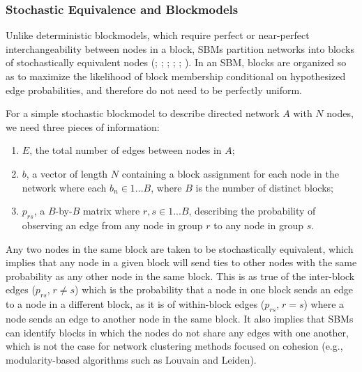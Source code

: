 \documentclass[
  12pt,
  a4paper,
  DIV=11,
  numbers=noendperiod,
  twoside,
  open=any]{scrartcl}
\providecommand{\tightlist}{%
  \setlength{\itemsep}{0pt}\setlength{\parskip}{0pt}}\usepackage{longtable,booktabs,array}
\begin{document}
\subsubsection{Stochastic Equivalence and
Blockmodels}\label{stochastic-equivalence-and-blockmodels}

Unlike deterministic blockmodels, which require perfect or near-perfect
interchangeability between nodes in a block, SBMs partition networks
into blocks of stochastically equivalent nodes
(; ; ; ; ;
). In
an SBM, blocks are organized so as to maximize the likelihood of block
membership conditional on hypothesized edge probabilities, and therefore
do not need to be perfectly uniform.

For a simple stochastic blockmodel to describe directed network \(A\)
with \(N\) nodes, we need three pieces of information:

\begin{enumerate}
\def\labelenumi{\arabic{enumi}.}
\tightlist
\item
  \(E\), the total number of edges between nodes in \(A\);
\item
  \(b\), a vector of length \(N\) containing a block assignment for each
  node in the network where each \(b_n\in{1...B}\), where \(B\) is the
  number of distinct blocks;
\item
  \(p_{rs}\), a \(B\)-by-\(B\) matrix where \(r,s\in{1...B}\),
  describing the probability of observing an edge from any node in group
  \(r\) to any node in group \(s\).
\end{enumerate}

Any two nodes in the same block are taken to be stochastically
equivalent, which implies that any node in a given block will send ties
to other nodes with the same probability as any other node in the same
block. This is as true of the inter-block edges
(\(p_{rs}\), \(r \neq s\)) which is the probability that a node in one
block sends an edge to a node in a different block, as it is of
within-block edges (\(p_{rs}\), \(r=s\)) where a node sends an edge to
another node in the same block. It also implies that SBMs can identify
blocks in which the nodes do not share any edges with one another, which
is not the case for network clustering methods focused on cohesion
(e.g., modularity-based algorithms such as Louvain and Leiden).
\end{document}
